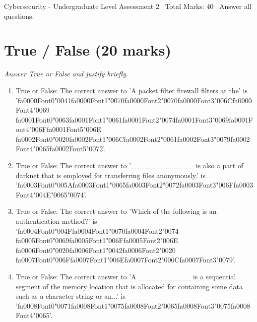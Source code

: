 \documentclass[12pt]{article}
\begin{document}
\begin{center}
Cybersecurity - Undergraduate Level Assessment 2 \
Total Marks: 40 \
Answer all questions.
\end{center}

\section*{True / False (20 marks)}
\textit{Answer True or False and justify briefly.}
\begin{enumerate}[label=\arabic*.]
\item True or False: The correct answer to 'A packet filter firewall filters at the' is '{\csname fa0000Font0\endcsname\char"0041}{\csname fa0000Font1\endcsname\char"0070}{\csname fa0000Font2\endcsname\char"0070}{\csname fa0000Font3\endcsname\char"006C}{\csname fa0000Font4\endcsname\char"0069} {\csname fa0001Font0\endcsname\char"0063}{\csname fa0001Font1\endcsname\char"0061}{\csname fa0001Font2\endcsname\char"0074}{\csname fa0001Font3\endcsname\char"0069}{\csname fa0001Font4\endcsname\char"006F}{\csname fa0001Font5\endcsname\char"006E} {\csname fa0002Font0\endcsname\char"0020}{\csname fa0002Font1\endcsname\char"006C}{\csname fa0002Font2\endcsname\char"0061}{\csname fa0002Font3\endcsname\char"0079}{\csname fa0002Font4\endcsname\char"0065}{\csname fa0002Font5\endcsname\char"0072}'.
\item True or False: The correct answer to '\_\_\_\_\_\_\_\_\_\_\_\_ is also a part of darknet that is employed for transferring files anonymously.' is '{\csname fa0003Font0\endcsname\char"005A}{\csname fa0003Font1\endcsname\char"0065}{\csname fa0003Font2\endcsname\char"0072}{\csname fa0003Font3\endcsname\char"006F}{\csname fa0003Font4\endcsname\char"004E}{\char"0065}{\char"0074}'.
\item True or False: The correct answer to 'Which of the following is an authentication method?' is '{\csname fa0004Font0\endcsname\char"004F}{\csname fa0004Font1\endcsname\char"0070}{\csname fa0004Font2\endcsname\char"0074} {\csname fa0005Font0\endcsname\char"0069}{\csname fa0005Font1\endcsname\char"006F}{\csname fa0005Font2\endcsname\char"006E} {\csname fa0006Font0\endcsname\char"0020}{\csname fa0006Font1\endcsname\char"0042}{\csname fa0006Font2\endcsname\char"0020} {\csname fa0007Font0\endcsname\char"006F}{\csname fa0007Font1\endcsname\char"006E}{\csname fa0007Font2\endcsname\char"006C}{\csname fa0007Font3\endcsname\char"0079}'.
\item True or False: The correct answer to 'A \_\_\_\_\_\_\_\_\_\_ is a sequential segment of the memory location that is allocated for containing some data such as a character string or an...' is '{\csname fa0008Font0\endcsname\char"0071}{\csname fa0008Font1\endcsname\char"0075}{\csname fa0008Font2\endcsname\char"0065}{\csname fa0008Font3\endcsname\char"0075}{\csname fa0008Font4\endcsname\char"0065}'.

\end{enumerate}
\end{document}
